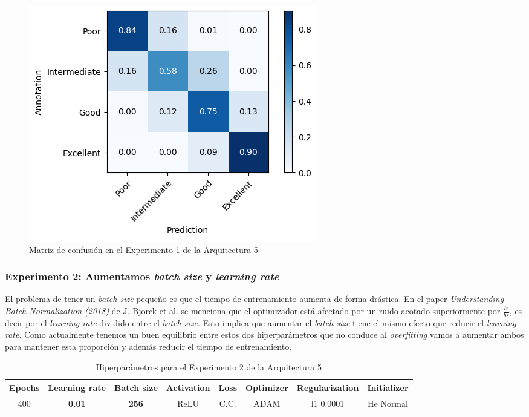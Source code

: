 \documentclass{article}
\begin{document}
			\begin{figure}[!h]
				\begin{center}
					\includegraphics[scale=0.7]{d-cm-a5-e1.png}		
					\caption{Matriz de confusi\'on en el Experimento 1 de la Arquitectura 5}	
					\label{d-cm-a5-e1}
				\end{center}
			\end{figure}
		
		\subsubsection{Experimento 2: Aumentamos \textit{batch size} y \textit{learning rate}}
		\label{d-s-a5-e2}
			El problema de tener un \textit{batch size} peque\~no es que el tiempo de entrenamiento aumenta de forma dr\'astica. En el paper \textit{Understanding Batch Normalization (2018)} de J. Bjorck et al. se menciona que el optimizador est\'a afectado por un ruido acotado superiormente por $\frac{lr}{bs}$, es decir por el \textit{learning rate} dividido entre el \textit{batch size}. Esto implica que aumentar el \textit{batch size} tiene el mismo efecto que reducir el \textit{learning rate}. Como actualmente tenemos un buen equilibrio entre estos dos hiperpar\'ametros que no conduce al \textit{overfitting} vamos a aumentar ambos para mantener esta proporci\'on y adem\'as reducir el tiempo de entrenamiento.
		
			\begin{table}[!h]
				\begin{center}
					\begin{tabular}{| c | c | c | c | c | c | c | c |}
						\textbf{Epochs} & \textbf{Learning rate} & \textbf{Batch size} & \textbf{Activation} & \textbf{Loss} & \textbf{Optimizer} & \textbf{Regularization} & \textbf{Initializer}\\ \hline
						 400 & \textbf{0.01} & \textbf{256} & ReLU & C.C. & ADAM & l1 0.0001 & He Normal
					\end{tabular}
					\caption{Hiperpar\'ametros para el Experimento 2 de la Arquitectura 5}
					\label{tab:hip-d-a5-e2}
				\end{center}
			\end{table}
\end{document}
